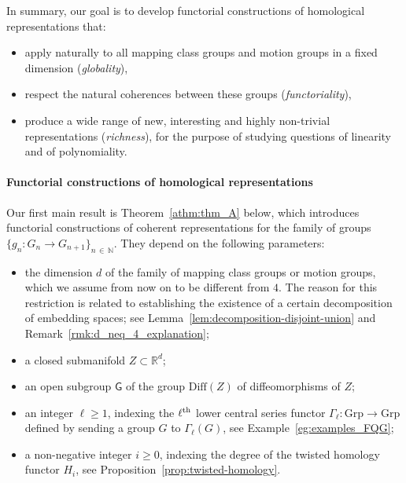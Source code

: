 \documentclass[AHL,Unicode,published]{cedram}
\newcommand{\Diff}{\mathrm{Diff}}
\newcommand{\groups}{\ensuremath{\mathrm{Grp}}}
\newcommand{\LCS}{\varGamma}
\newcommand{\sG}{\mathsf{G}}
\newcommand{\bN}{\mathbb{N}}
\newcommand{\bR}{\mathbb{R}}
\renewcommand{\geq}{\geqslant}
\begin{document}
In summary, our goal is to develop functorial constructions of homological representations that:
\begin{itemize}
\item apply naturally to all mapping class groups and motion groups in a fixed dimension (\emph{globality}),
\item respect the natural coherences between these groups (\emph{functoriality}),
\item produce a wide range of new, interesting and highly non-trivial representations (\emph{richness}), for the purpose of studying questions of linearity and of polynomiality.
\end{itemize}


\paragraph*{Functorial constructions of homological representations}
Our first main result is Theorem~\ref{athm:thm_A} below, which introduces functorial constructions of coherent representations for the family of groups $\{g_{n} \colon G_{n} \to G_{n+1}\}_{n\,\in\,\bN}$. They depend on the following parameters:
\begin{itemize}
\item the dimension $d$ of the family of mapping class groups or motion groups, which we assume from now on to be different from $4$. The reason for this restriction is related to establishing the existence of a certain decomposition of embedding spaces; see Lemma~\ref{lem:decomposition-disjoint-union} and Remark~\ref{rmk:d_neq_4_explanation};
\item a closed submanifold $Z \subset \bR^d$;
\item an open subgroup $\sG$ of the group $\Diff(Z)$ of diffeomorphisms of $Z$;
\item an integer $\ell \geq 1$, indexing the $\ell^{\rm th}$ lower central series functor $\LCS_{\ell}\colon \groups \to \groups$ defined by sending a group $G$ to $\LCS_{\ell}(G)$, see Example~\ref{eg:examples_FQG};
\item a non-negative integer $i \geq 0$, indexing the degree of the twisted homology functor $H_{i}$, see Proposition~\ref{prop:twisted-homology}.
\end{itemize}
\end{document}
